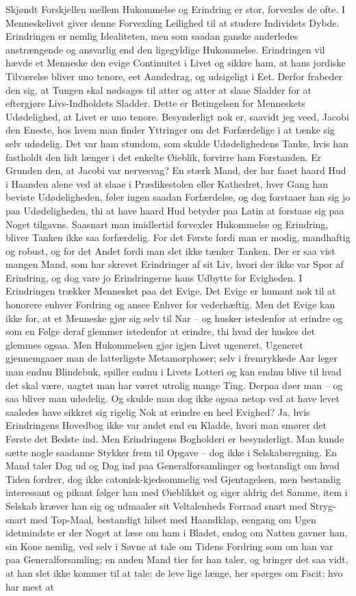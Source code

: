 \documentclass[12pt,a4paper]{article}
\begin{document}
Skjøndt Forskjellen mellem Hukommelse og Erindring er stor, forvexles de ofte. I Menneskelivet giver denne Forvexling Leilighed til at studere Individets Dybde. Erindringen er nemlig Idealiteten, men som saadan ganske anderledes anstrængende og ansvarlig end den ligegyldige Hukommelse. Erindringen vil hævde et Menneske den evige Continuitet i Livet og sikkre ham, at hans jordiske Tilværelse bliver uno tenore, eet Aandedrag, og udsigeligt i Eet. Derfor frabeder den sig, at Tungen skal nødsages til atter og atter at slaae Sladder for at eftergjøre Livs-Indholdets Sladder. Dette er Betingelsen for Menneskets Udødelighed, at Livet er uno tenore. Besynderligt nok er, saavidt jeg veed, Jacobi den Eneste, hos hvem man finder Yttringer om det Forfærdelige i at tænke sig selv udødelig. Det var ham stundom, som skulde Udødelighedens Tanke, hvis han fastholdt den lidt længer i det enkelte Øieblik, forvirre ham Forstanden. Er Grunden den, at Jacobi var nervesvag? En stærk Mand, der har faaet haard Hud i Haanden alene ved at slaae i Prædikestolen eller Kathedret, hver Gang han beviste Udødeligheden, føler ingen saadan Forfærdelse, og dog forstaaer han sig jo paa Udødeligheden, thi at have haard Hud betyder paa Latin at forstaae sig paa Noget tilgavns. Saasnart man imidlertid forvexler Hukommelse og Erindring, bliver Tanken ikke saa forfærdelig. For det Første fordi man er modig, mandhaftig og robust, og for det Andet fordi man slet ikke tænker Tanken. Der er saa vist mangen Mand, som har skrevet Erindringer af sit Liv, hvori der ikke var Spor af Erindring, og dog vare jo Erindringerne hans Udbytte for Evigheden. I Erindringen trækker Mennesket paa det Evige. Det Evige er humant nok til at honorere enhver Fordring og ansee Enhver for vederhæftig. Men det Evige kan ikke for, at et Menneske gjør sig selv til Nar – og husker istedenfor at erindre og som en Følge deraf glemmer istedenfor at erindre, thi hvad der huskes det glemmes ogsaa. Men Hukommelsen gjør igjen Livet ugeneret. Ugeneret gjennemgaaer man de latterligste Metamorphoser; selv i fremrykkede Aar leger man endnu Blindebuk, spiller endnu i Livets Lotteri og kan endnu blive til hvad det skal være, uagtet man har været utrolig mange Ting. Derpaa døer man – og saa bliver man udødelig. Og skulde man dog ikke ogsaa netop ved at have levet saaledes have sikkret sig rigelig Nok at erindre en heel Evighed? Ja, hvis Erindringens Hovedbog ikke var andet end en Kladde, hvori man smører det Første det Bedste ind. Men Erindringens Bogholderi er besynderligt. Man kunde sætte nogle saadanne Stykker frem til Opgave – dog ikke i Selskabsregning. En Mand taler Dag ud og Dag ind paa Generalforsamlinger og bestandigt om hvad Tiden fordrer, dog ikke catonisk-kjedsommelig ved Gjentagelsen, men bestandig interessant og pikant følger han med Øieblikket og siger aldrig det Samme, item i Selskab kræver han sig og udmaaler sit Veltalenheds Forraad snart med Stryg- snart med Top-Maal, bestandigt hilset med Haandklap, eengang om Ugen idetmindste er der Noget at læse om ham i Bladet, endog om Natten gavner han, sin Kone nemlig, ved selv i Søvne at tale om Tidens Fordring som om han var paa Generalforsamling; en anden Mand tier før han taler, og bringer det saa vidt, at han slet ikke kommer til at tale: de leve lige længe, her spørges om Facit: hvo har mest at 
\end{document}
